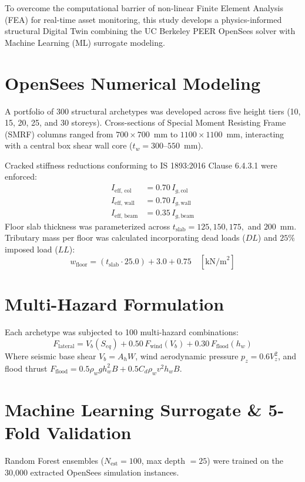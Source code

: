 \documentclass[journal,10pt,twocolumn]{IEEEtran}
\begin{document}
To overcome the computational barrier of non-linear Finite Element Analysis (FEA) for real-time asset monitoring, this study develops a physics-informed structural Digital Twin combining the UC Berkeley PEER OpenSees solver \cite{mckenna2000} with Machine Learning (ML) surrogate modeling.

\section{OpenSees Numerical Modeling}
A portfolio of 300 structural archetypes was developed across five height tiers (10, 15, 20, 25, and 30 storeys). Cross-sections of Special Moment Resisting Frame (SMRF) columns ranged from $700 \times 700$~mm to $1100 \times 1100$~mm, interacting with a central box shear wall core ($t_w = 300$--$550$~mm).

Cracked stiffness reductions conforming to IS 1893:2016 Clause 6.4.3.1 were enforced:
\begin{align}
I_{\text{eff, col}} &= 0.70 \, I_{g,\text{col}} \\
I_{\text{eff, wall}} &= 0.70 \, I_{g,\text{wall}} \\
I_{\text{eff, beam}} &= 0.35 \, I_{g,\text{beam}}
\end{align}
Floor slab thickness was parameterized across $t_{\text{slab}} = 125, 150, 175,$ and $200$~mm. Tributary mass per floor was calculated incorporating dead loads ($DL$) and $25\%$ imposed load ($LL$):
\begin{equation}
w_{\text{floor}} = (t_{\text{slab}} \cdot 25.0) + 3.0 + 0.75 \quad [\text{kN/m}^2]
\end{equation}

\section{Multi-Hazard Formulation}
Each archetype was subjected to 100 multi-hazard combinations:
\begin{equation}
F_{\text{lateral}} = V_b(S_{eq}) + 0.50 \, F_{\text{wind}}(V_b) + 0.30 \, F_{\text{flood}}(h_w)
\end{equation}
Where seismic base shear $V_b = A_h W$, wind aerodynamic pressure $p_z = 0.6 V_z^2$, and flood thrust $F_{\text{flood}} = 0.5 \rho_w g h_w^2 B + 0.5 C_d \rho_w v^2 h_w B$.

\section{Machine Learning Surrogate \& 5-Fold Validation}
Random Forest ensembles ($N_{\text{est}} = 100$, max depth $= 25$) were trained on the 30,000 extracted OpenSees simulation instances.
\end{document}
